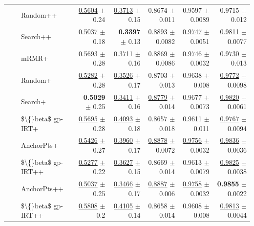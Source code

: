 \begin{longtable}{llp{}rrrrr}
 &  & Random++ & \underline{0.5604} {\scriptsize $\pm$ 0.24} & \underline{0.3713} {\scriptsize $\pm$ 0.15} & 0.8674 {\scriptsize $\pm$ 0.011} & 0.9597 {\scriptsize $\pm$ 0.0089} & 0.9715 {\scriptsize $\pm$ 0.012} \\
 &  & Search++ & \underline{0.5037} {\scriptsize $\pm$ 0.18} & \textbf{0.3397} {\scriptsize $\pm$ 0.13} & \underline{0.8893} {\scriptsize $\pm$ 0.0082} & \underline{0.9747} {\scriptsize $\pm$ 0.0051} & \underline{0.9811} {\scriptsize $\pm$ 0.0077} \\
 &  & mRMR+ & \underline{0.5693} {\scriptsize $\pm$ 0.28} & \underline{0.3711} {\scriptsize $\pm$ 0.16} & \underline{0.8869} {\scriptsize $\pm$ 0.0086} & \underline{0.9746} {\scriptsize $\pm$ 0.0032} & \underline{0.9730} {\scriptsize $\pm$ 0.013} \\
 &  & Random+ & \underline{0.5282} {\scriptsize $\pm$ 0.28} & \underline{0.3526} {\scriptsize $\pm$ 0.17} & 0.8703 {\scriptsize $\pm$ 0.013} & 0.9638 {\scriptsize $\pm$ 0.008} & \underline{0.9772} {\scriptsize $\pm$ 0.0098} \\
 &  & Search+ & \textbf{0.5029} {\scriptsize $\pm$ 0.25} & \underline{0.3411} {\scriptsize $\pm$ 0.16} & \underline{0.8779} {\scriptsize $\pm$ 0.014} & 0.9677 {\scriptsize $\pm$ 0.0073} & \underline{0.9820} {\scriptsize $\pm$ 0.0061} \\
 &  & \$\textbackslash\{\}beta\$ gp-IRT+ & \underline{0.5695} {\scriptsize $\pm$ 0.28} & \underline{0.4093} {\scriptsize $\pm$ 0.18} & 0.8657 {\scriptsize $\pm$ 0.018} & 0.9611 {\scriptsize $\pm$ 0.011} & \underline{0.9767} {\scriptsize $\pm$ 0.0094} \\
 &  & AnchorPts+ & \underline{0.5426} {\scriptsize $\pm$ 0.27} & \underline{0.3960} {\scriptsize $\pm$ 0.17} & \underline{0.8878} {\scriptsize $\pm$ 0.0072} & \underline{0.9756} {\scriptsize $\pm$ 0.0032} & \underline{0.9836} {\scriptsize $\pm$ 0.0036} \\
 &  & \$\textbackslash\{\}beta\$ gp-IRT++ & \underline{0.5277} {\scriptsize $\pm$ 0.22} & \underline{0.3627} {\scriptsize $\pm$ 0.15} & 0.8669 {\scriptsize $\pm$ 0.014} & 0.9613 {\scriptsize $\pm$ 0.0079} & \underline{0.9825} {\scriptsize $\pm$ 0.0038} \\
 &  & AnchorPts++ & \underline{0.5037} {\scriptsize $\pm$ 0.25} & \underline{0.3466} {\scriptsize $\pm$ 0.17} & \underline{0.8887} {\scriptsize $\pm$ 0.006} & \underline{0.9758} {\scriptsize $\pm$ 0.0032} & \textbf{0.9855} {\scriptsize $\pm$ 0.0022} \\
 &  & \$\textbackslash\{\}beta\$ gp-IRT++ & \underline{0.5808} {\scriptsize $\pm$ 0.2} & \underline{0.4105} {\scriptsize $\pm$ 0.14} & 0.8658 {\scriptsize $\pm$ 0.014} & 0.9608 {\scriptsize $\pm$ 0.008} & \underline{0.9813} {\scriptsize $\pm$ 0.0044} \\

\end{longtable}
